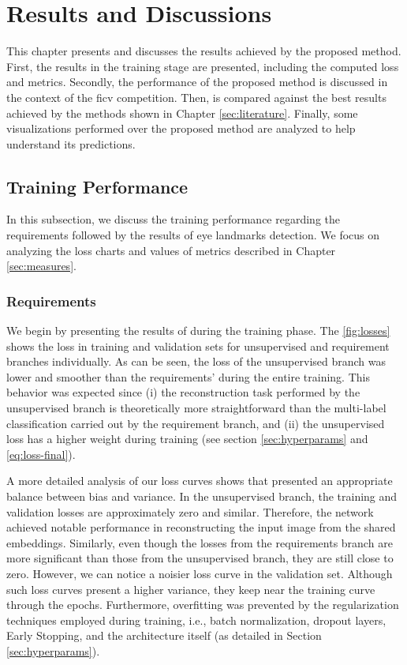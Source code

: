 \section{Results and Discussions} \label{sec:results}
 
This chapter presents and discusses the results achieved by the proposed method. First, the \methodname results in the training stage are presented, including the computed loss and metrics. Secondly, the performance of the proposed method is discussed in the context of the \acs{ficv} competition. Then, \methodname is compared against the best results achieved by the methods shown in Chapter \ref{sec:literature}. Finally, some visualizations performed over the proposed method are analyzed to help understand its predictions.
 
\subsection{Training Performance}
 
In this subsection, we discuss the training performance regarding the \icao requirements followed by the results of eye landmarks detection. We focus on analyzing the loss charts and values of metrics described in Chapter \ref{sec:measures}.
 
\subsubsection{Requirements}
 
We begin by presenting the results of \methodname during the training phase. The \autoref{fig:losses} shows the loss in training and validation sets for unsupervised and requirement branches individually. As can be seen, the loss of the unsupervised branch was lower and smoother than the requirements' during the entire training. This behavior was expected since (i) the reconstruction task performed by the unsupervised branch is theoretically more straightforward than the multi-label classification carried out by the requirement branch, and (ii) the unsupervised loss has a higher weight during training (see section \ref{sec:hyperparams} and \autoref{eq:loss-final}). 
 
A more detailed analysis of our loss curves shows that \methodname presented an appropriate balance between bias and variance. In the unsupervised branch, the training and validation losses are approximately zero and similar. Therefore, the network achieved notable performance in reconstructing the input image from the shared embeddings. Similarly, even though the losses from the requirements branch are more significant than those from the unsupervised branch, they are still close to zero. However, we can notice a noisier loss curve in the validation set. Although such loss curves present a higher variance, they keep near the training curve through the epochs. Furthermore, overfitting was prevented by the regularization techniques employed during training, i.e., batch normalization, dropout layers, Early Stopping, and the architecture itself (as detailed in Section \ref{sec:hyperparams}).
 
